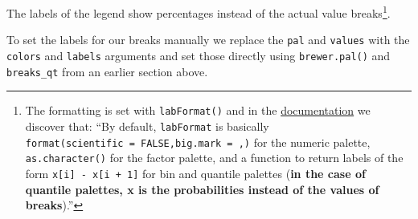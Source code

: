 \documentclass[]{book}
\newenvironment{Shaded}{\begin{snugshade}}{\end{snugshade}}
\newcommand{\KeywordTok}[1]{\textcolor[rgb]{0.13,0.29,0.53}{\textbf{#1}}}
\newcommand{\DataTypeTok}[1]{\textcolor[rgb]{0.13,0.29,0.53}{#1}}
\newcommand{\FloatTok}[1]{\textcolor[rgb]{0.00,0.00,0.81}{#1}}
\newcommand{\StringTok}[1]{\textcolor[rgb]{0.31,0.60,0.02}{#1}}
\newcommand{\CommentTok}[1]{\textcolor[rgb]{0.56,0.35,0.01}{\textit{#1}}}
\newcommand{\OtherTok}[1]{\textcolor[rgb]{0.56,0.35,0.01}{#1}}
\newcommand{\OperatorTok}[1]{\textcolor[rgb]{0.81,0.36,0.00}{\textbf{#1}}}
\newcommand{\NormalTok}[1]{#1}
\let\rmarkdownfootnote\footnote%
\def\footnote{\protect\rmarkdownfootnote}
\begin{document}
\begin{Shaded}
\end{Shaded}

\hypertarget{htmlwidget-98d9098218d1aa7f6f9b}{}

The labels of the legend show percentages instead of the actual value
breaks\footnote{The formatting is set with \texttt{labFormat()} and in
  the
  \href{https://cran.r-project.org/web/packages/leaflet/leaflet.pdf}{documentation}
  we discover that: ``By default, \texttt{labFormat} is basically
  \texttt{format(scientific\ =\ FALSE,big.mark\ =\ \textquotesingle{},\textquotesingle{})}
  for the numeric palette, \texttt{as.character()} for the factor
  palette, and a function to return labels of the form
  \texttt{x{[}i{]}\ -\ x{[}i\ +\ 1{]}} for bin and quantile palettes
  (\textbf{in the case of quantile palettes, x is the probabilities
  instead of the values of breaks}).''}.

To set the labels for our breaks manually we replace the \texttt{pal}
and \texttt{values} with the \texttt{colors} and \texttt{labels}
arguments and set those directly using \texttt{brewer.pal()} and
\texttt{breaks\_qt} from an earlier section above.
\end{document}
